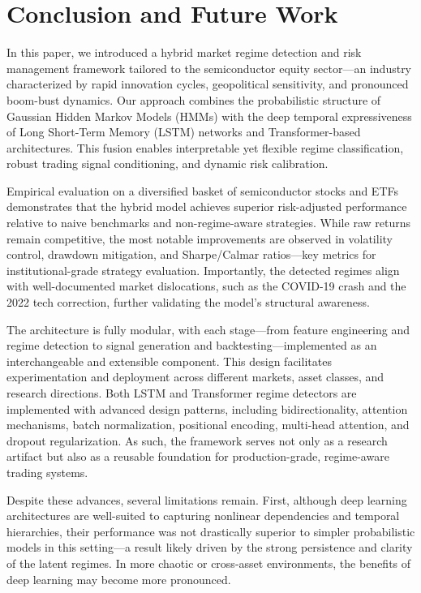 \section{Conclusion and Future Work}

In this paper, we introduced a hybrid market regime detection and risk management framework tailored to the semiconductor equity sector—an industry characterized by rapid innovation cycles, geopolitical sensitivity, and pronounced boom-bust dynamics. Our approach combines the probabilistic structure of Gaussian Hidden Markov Models (HMMs) with the deep temporal expressiveness of Long Short-Term Memory (LSTM) networks and Transformer-based architectures. This fusion enables interpretable yet flexible regime classification, robust trading signal conditioning, and dynamic risk calibration.

Empirical evaluation on a diversified basket of semiconductor stocks and ETFs demonstrates that the hybrid model achieves superior risk-adjusted performance relative to naive benchmarks and non-regime-aware strategies. While raw returns remain competitive, the most notable improvements are observed in volatility control, drawdown mitigation, and Sharpe/Calmar ratios—key metrics for institutional-grade strategy evaluation. Importantly, the detected regimes align with well-documented market dislocations, such as the COVID-19 crash and the 2022 tech correction, further validating the model's structural awareness.

The architecture is fully modular, with each stage—from feature engineering and regime detection to signal generation and backtesting—implemented as an interchangeable and extensible component. This design facilitates experimentation and deployment across different markets, asset classes, and research directions. Both LSTM and Transformer regime detectors are implemented with advanced design patterns, including bidirectionality, attention mechanisms, batch normalization, positional encoding, multi-head attention, and dropout regularization. As such, the framework serves not only as a research artifact but also as a reusable foundation for production-grade, regime-aware trading systems.

Despite these advances, several limitations remain. First, although deep learning architectures are well-suited to capturing nonlinear dependencies and temporal hierarchies, their performance was not drastically superior to simpler probabilistic models in this setting—a result likely driven by the strong persistence and clarity of the latent regimes. In more chaotic or cross-asset environments, the benefits of deep learning may become more pronounced.

